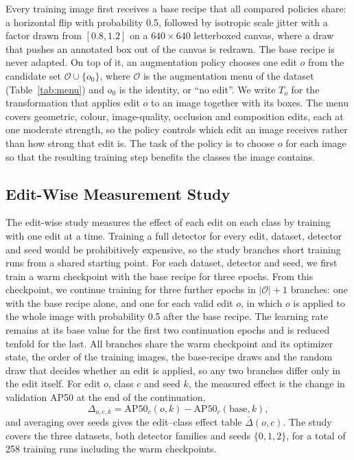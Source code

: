 \documentclass[conference]{IEEEtran}
\begin{document}
Every training image first receives a base recipe that all compared policies share: a horizontal flip with probability 0.5, followed by isotropic scale jitter with a factor drawn from $[0.8,1.2]$ on a $640\times640$ letterboxed canvas, where a draw that pushes an annotated box out of the canvas is redrawn. The base recipe is never adapted. On top of it, an augmentation policy chooses one edit $o$ from the candidate set $\mathcal{O}\cup\{o_0\}$, where $\mathcal{O}$ is the augmentation menu of the dataset (Table~\ref{tab:menu}) and $o_0$ is the identity, or ``no edit''. We write $T_o$ for the transformation that applies edit $o$ to an image together with its boxes. The menu covers geometric, colour, image-quality, occlusion and composition edits, each at one moderate strength, so the policy controls which edit an image receives rather than how strong that edit is. The task of the policy is to choose $o$ for each image so that the resulting training step benefits the classes the image contains.

\subsection{Edit-Wise Measurement Study}
\label{sec:measure_editwise}

The edit-wise study measures the effect of each edit on each class by training with one edit at a time. Training a full detector for every edit, dataset, detector and seed would be prohibitively expensive, so the study branches short training runs from a shared starting point. For each dataset, detector and seed, we first train a warm checkpoint with the base recipe for three epochs. From this checkpoint, we continue training for three further epochs in $|\mathcal{O}|+1$ branches: one with the base recipe alone, and one for each valid edit $o$, in which $o$ is applied to the whole image with probability 0.5 after the base recipe. The learning rate remains at its base value for the first two continuation epochs and is reduced tenfold for the last. All branches share the warm checkpoint and its optimizer state, the order of the training images, the base-recipe draws and the random draw that decides whether an edit is applied, so any two branches differ only in the edit itself. For edit $o$, class $c$ and seed $k$, the measured effect is the change in validation AP50 at the end of the continuation,
\begin{equation}
\Delta_{o,c,k}=\mathrm{AP50}_c(o,k)-\mathrm{AP50}_c(\mathrm{base},k),
\label{eq:delta}
\end{equation}
and averaging over seeds gives the edit--class effect table $\bar\Delta(o,c)$. The study covers the three datasets, both detector families and seeds $\{0,1,2\}$, for a total of 258 training runs including the warm checkpoints.
\end{document}
